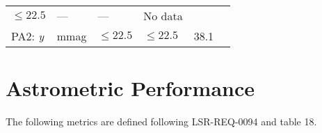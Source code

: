 \documentclass[DM,lsstdraft,toc]{lsstdoc}
\begin{document}
\begin{longtable}[]{@{}llllll@{}}
\begin{minipage}[t]{0.17\columnwidth}
\(\leq 22.5\)\strut
\end{minipage} & \begin{minipage}[t]{0.17\columnwidth}\raggedright\strut
---\strut
\end{minipage} & \begin{minipage}[t]{0.12\columnwidth}\raggedright\strut
---\strut
\end{minipage} & \begin{minipage}[t]{0.17\columnwidth}\raggedright\strut
No data\strut
\end{minipage}\tabularnewline
\begin{minipage}[t]{0.14\columnwidth}\raggedright\strut
PA2: \emph{y}\strut
\end{minipage} & \begin{minipage}[t]{0.06\columnwidth}\raggedright\strut
mmag\strut
\end{minipage} & \begin{minipage}[t]{0.17\columnwidth}\raggedright\strut
\(\leq 22.5\)\strut
\end{minipage} & \begin{minipage}[t]{0.17\columnwidth}\raggedright\strut
\(\leq 22.5\)\strut
\end{minipage} & \begin{minipage}[t]{0.12\columnwidth}\raggedright\strut
38.1\strut
\end{minipage} & \begin{minipage}[t]{0.17\columnwidth}\raggedright\strut
\strut
\end{minipage}\tabularnewline
\bottomrule
\end{longtable}

\section{Astrometric Performance}\label{astrometric-performance}


The following metrics are defined following LSR-REQ-0094
 and  table 18.
\end{document}
